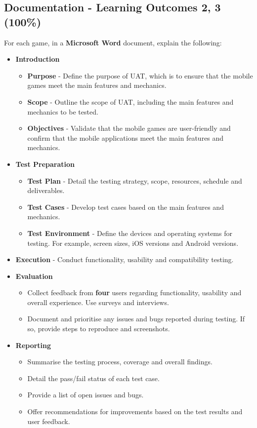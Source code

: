 \documentclass{article}
\begin{document}
\subsection*{Documentation - Learning Outcomes 2, 3 (100\%)}
For each game, in a \textbf{Microsoft Word} document, explain the following:
\begin{itemize}
    \item \textbf{Introduction} 
    \begin{itemize}
        \item \textbf{Purpose} - Define the purpose of UAT, which is to ensure that the mobile games meet the main features and mechanics.
        \item \textbf{Scope} - Outline the scope of UAT, including the main features and mechanics to be tested.
        \item \textbf{Objectives} - Validate that the mobile games are user-friendly and confirm that the mobile applications meet the main features and mechanics.
    \end{itemize}

    \item \textbf{Test Preparation}
    \begin{itemize}
        \item \textbf{Test Plan} - Detail the testing strategy, scope, resources, schedule and deliverables.
        \item \textbf{Test Cases} - Develop test cases based on the main features and mechanics.
        \item \textbf{Test Environment} - Define the devices and operating systems for testing. For example, screen sizes, iOS versions and Android versions.
    \end{itemize}
    
    \item \textbf{Execution} - Conduct functionality, usability and compatibility testing.

    \item \textbf{Evaluation}
    \begin{itemize}
        \item Collect feedback from \textbf{four} users regarding functionality, usability and overall experience. Use surveys and interviews.
        \item Document and prioritise any issues and bugs reported during testing. If so, provide steps to reproduce and screenshots.
    \end{itemize}

    \item \textbf{Reporting}
    \begin{itemize}
        \item Summarise the testing process, coverage and overall findings.
        \item Detail the pass/fail status of each test case.
        \item Provide a list of open issues and bugs.
        \item Offer recommendations for improvements based on the test results and user feedback.
    \end{itemize}

\end{itemize}
\end{document}
